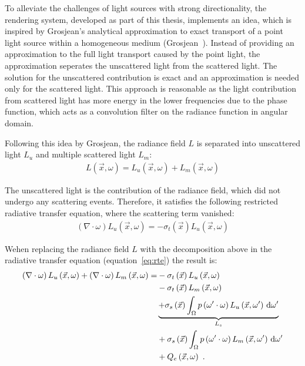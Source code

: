To alleviate the challenges of light sources with strong directionality, the rendering system, developed as part of this thesis, implements an idea, which is inspired by Grosjean’s analytical approximation to exact transport of a point light source within a homogeneous medium (Grosjean~\cite{Grosjean56}). Instead of providing an approximation to the full light transport caused by the point light, the approximation seperates the unscattered light from the scattered light. The solution for the unscattered contribution is exact and an approximation is needed only for the scattered light. This approach is reasonable as the light contribution from scattered light has more energy in the lower frequencies due to the phase function, which acts as a convolution filter on the radiance function in angular domain.

Following this idea by Grosjean, the radiance field $L$ is separated into unscattered light $L_{u}$ and multiple scattered light $L_m$:
\begin{align}
L\left(\vec{x}, \omega\right) = 
L_u\left(\vec{x}, \omega\right)
+L_m\left(\vec{x}, \omega\right)
\end{align}

The unscattered light is the contribution of the radiance field, which did not undergo any scattering events. Therefore, it satisfies the following restricted radiative transfer equation, where the scattering term vanished:
\begin{align}
\left(\nabla\cdot\omega\right)L_u\left(\vec{x}, \omega \right)
=
-\sigma_t\left(\vec{x}\right) L_u\left(\vec{x}, \omega \right)
\label{eq:restricted_rte}
\end{align}


Wehen replacing the radiance field $L$ with the decomposition above in the radiative transfer equation (equation~\ref{eq:rte}) the result is:
\begin{align}
\left(\nabla\cdot\omega\right)L_u\left(\vec{x}, \omega \right)
+\left(\nabla\cdot\omega\right)L_m\left(\vec{x}, \omega \right)
=&
-\sigma_t\left(\vec{x}\right) L_u\left(\vec{x}, \omega \right)
\nonumber\\
&
-\sigma_t\left(\vec{x}\right) L_m\left(\vec{x}, \omega \right)\nonumber\\
&
\underbrace
{
+\sigma_s\left(\vec{x}\right) \int_{\Omega}
{
p\left(\omega'\cdot\omega\right)L_u\left(\vec{x}, \omega' \right)\,\mathrm{d}\omega'
}
}_{L_s}
\nonumber\\
&
+\sigma_s\left(\vec{x}\right) \int_{\Omega}
{
p\left(\omega'\cdot\omega\right)L_m\left(\vec{x}, \omega' \right)\,\mathrm{d}\omega'
}
\nonumber
\\
&
+Q_e\left(\vec{x}, \omega\right)
\nonumber
\  .
\end{align}

